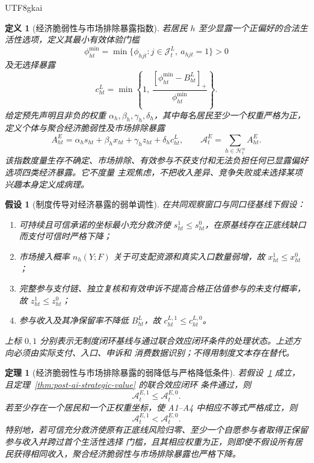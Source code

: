 \documentclass[12pt,a4paper,openany]{report}
\newtheorem{definition}{定义}[chapter]
\newtheorem{assumption}{假设}[chapter]
\newtheorem{theorem}{定理}[chapter]
\begin{document}
\begin{CJK*}{UTF8}{gkai}
\begin{definition}[经济脆弱性与市场排除暴露指数]
若居民 \(h\) 至少显露一个正偏好的合法生活性选项，定义其最小有效体验门槛
\[
  \phi_{ht}^{\min}
  =
  \min\{\phi_{hjt}:j\in\mathcal J_t^L,\ a_{hjt}=1\}>0
\]
及无选择暴露
\[
  c_{ht}^{L}
  =
  \min\left\{
  1,\,
  \frac{[\phi_{ht}^{\min}-B_{ht}^{L}]_+}{\phi_{ht}^{\min}}
  \right\}.
\]
给定预先声明且非负的权重
\(\alpha_h,\beta_h,\gamma_h,\delta_h\)，其中每名居民至少一个权重严格为正，定义个体与聚合经济脆弱性及市场排除暴露
\[
  A_{ht}^{E}
  =
  \alpha_hs_{ht}
  +\beta_hx_{ht}
  +\gamma_hz_{ht}
  +\delta_hc_{ht}^{L},
  \qquad
  \mathcal A_t^{E}
  =
  \sum_{h\in\mathcal H_t^w}A_{ht}^{E}.
\]
该指数度量生存不确定、市场排除、有效参与不获支付和无法负担任何已显露偏好选项四类经济暴露。它不度量
主观焦虑，不把收入差异、竞争失败或未选择某项兴趣本身定义成病理。
\end{definition}

\begin{assumption}[制度传导对经济暴露的弱单调性]
\label{ass:economic-anxiety-monotonicity}
在共同观察窗口与同口径基线下假设：
\begin{enumerate}[label=\textup{(A\arabic*)},leftmargin=4em]
  \item 可持续且可信承诺的坐标最小充分救济使
  \(s_{ht}^{1}\le s_{ht}^{0}\)，在原基线存在正底线缺口而支付可信时严格下降；
  \item 市场接入概率 \(n_h(Y;F)\) 关于可支配资源和真实入口数量弱增，故
  \(x_{ht}^{1}\le x_{ht}^{0}\)；
  \item 完整参与支付链、独立复核和有效申诉不提高合格正估值参与的未支付概率，故
  \(z_{ht}^{1}\le z_{ht}^{0}\)；
  \item 参与收入及其净保留率不降低 \(B_{ht}^{L}\)，故
  \(c_{ht}^{L,1}\le c_{ht}^{L,0}\)。
\end{enumerate}
上标 \(0,1\) 分别表示无制度闭环基线与通过联合效应闭环条件的处理状态。上述方向必须由实际支付、入口、申诉和
消费数据识别；不得用制度文本存在替代。
\end{assumption}

\begin{theorem}[经济脆弱性与市场排除暴露的弱降低与严格降低条件]
\label{thm:economic-anxiety-exposure-reduction}
若假设~\ref{ass:economic-anxiety-monotonicity} 成立，且定理~\ref{thm:post-ai-strategic-value} 的联合效应闭环
条件通过，则
\[
  \mathcal A_t^{E,1}\le\mathcal A_t^{E,0}.
\]
若至少存在一个居民和一个正权重坐标，使 A1--A4 中相应不等式严格成立，则
\[
  \mathcal A_t^{E,1}<\mathcal A_t^{E,0}.
\]
特别地，若可信充分救济使原有正底线风险归零、至少一个自愿参与者取得正保留参与收入并跨过首个生活性选择
门槛，且其相应权重为正，则即使不假设所有居民获得相同收入，聚合经济脆弱性与市场排除暴露也严格下降。
\end{theorem}


\end{CJK*}
\end{document}
